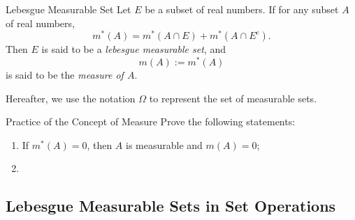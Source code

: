 \begin{definition}{Lebesgue Measurable Set}{}
  Let $E$ be a subset of real numbers.
  If for any subset $A$ of real numbers,
  \begin{equation}
    m^{\ast}(A) = m^{\ast}(A \cap E) + m^{\ast}(A \cap E^c).
  \end{equation}
  Then $E$ is said to be a \emph{lebesgue measurable set},
  and
  \begin{equation}
    m(A) := m^{\ast}(A)
  \end{equation}
  is said to be the \emph{measure of $A$}.
\end{definition}

\begin{note}
  Hereafter, we use the notation $\Omega$ to represent the set of measurable sets.
\end{note}

\begin{example}{Practice of the Concept of Measure}{}
  Prove the following statements:
  \begin{enumerate}
  \item If $m^{\ast}(A) = 0$, then $A$ is measurable and $m(A) = 0$;
  \item 
  \end{enumerate}
\end{example}

\subsection{Lebesgue Measurable Sets in Set Operations}


